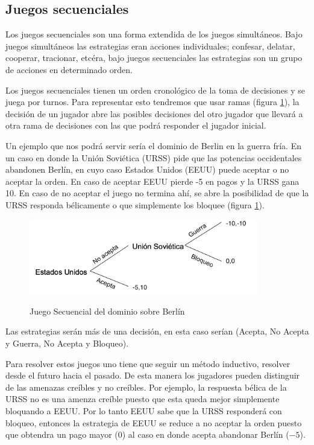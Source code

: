 \subsection{Juegos secuenciales}

Los juegos secuenciales son una forma extendida de los juegos simultáneos. Bajo juegos simultáneos las estrategias eran acciones individuales; confesar, delatar, cooperar, tracionar, etcéra, bajo juegos secuenciales las estrategias son un grupo de acciones en determinado orden. 

Los juegos secuenciales tienen un orden cronológico de la toma de decisiones y se juega por turnos. Para representar esto tendremos que usar ramas (figura \ref{Secuencia Soviética}), la decisión de un jugador abre las posibles decisiones del otro jugador que llevará a otra rama de decisiones con las que podrá responder el jugador inicial.

Un ejemplo que nos podrá servir sería el dominio de Berlin en la guerra fría. En un caso en donde la Unión Soviética (URSS) pide que las potencias occidentales abandonen Berlín, en cuyo caso Estados Unidos (EEUU) puede aceptar o no aceptar la orden. En caso de aceptar EEUU pierde -5 en pagos y la URSS gana 10. En caso de no aceptar el juego no termina ahí, se abre la posibilidad de que la URSS responda bélicamente o que simplemente los bloquee (figura \ref{Secuencia Soviética}). 
\begin{figure}[htb]
  \centering
  \caption{Juego Secuencial del dominio sobre Berlín}
  \includegraphics[width=10cm]{Figuras/juegos secuencia.png}
  \label{Secuencia Soviética}
\end{figure}

Las estrategias serán más de una decisión, en esta caso serían (Acepta, No Acepta y Guerra, No Acepta y Bloqueo).

Para resolver estos juegos uno tiene que seguir un método inductivo, resolver desde el futuro hacia el pasado. De esta manera los jugadores pueden distinguir de las amenazas creíbles y no creíbles. Por ejemplo, la respuesta bélica de la URSS no es una amenza creíble puesto que esta queda mejor simplemente bloquando a EEUU. Por lo tanto EEUU sabe que la URSS responderá con bloqueo, entonces la estrategia de EEUU se reduce a no aceptar la orden puesto que obtendra un pago mayor ($0$) al caso en donde acepta abandonar Berlín ($-5$).

